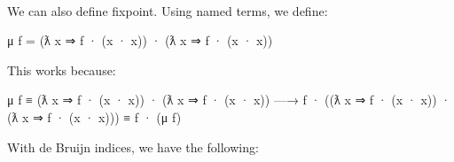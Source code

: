 \begin{fence}
\begin{code}
\AgdaSymbol{(}\AgdaSpace{}%
\AgdaSymbol{(}\AgdaSpace{}%
\AgdaSymbol{))}\AgdaSpace{}%
\AgdaSpace{}%
\AgdaSymbol{(}\AgdaSpace{}%
\AgdaSymbol{(}\AgdaSpace{}%
\AgdaSymbol{(}\AgdaSpace{}%
\AgdaSymbol{(}\AgdaSpace{}%
\AgdaSymbol{))))))))}\<%
\\
\>[0]\AgdaSymbol{\AgdaUnderscore{}}\AgdaSpace{}%
\AgdaSymbol{=}\AgdaSpace{}%
\<%
\end{code}
\end{fence}

We can also define fixpoint. Using named terms, we define:

\begin{myDisplay}
μ f = (ƛ x ⇒ f · (x · x)) · (ƛ x ⇒ f · (x · x))
\end{myDisplay}

This works because:

\begin{myDisplay}
  μ f
≡
  (ƛ x ⇒ f · (x · x)) · (ƛ x ⇒ f · (x · x))
—→
  f · ((ƛ x ⇒ f · (x · x)) · (ƛ x ⇒ f · (x · x)))
≡
  f · (μ f)
\end{myDisplay}

With de Bruijn indices, we have the following:

